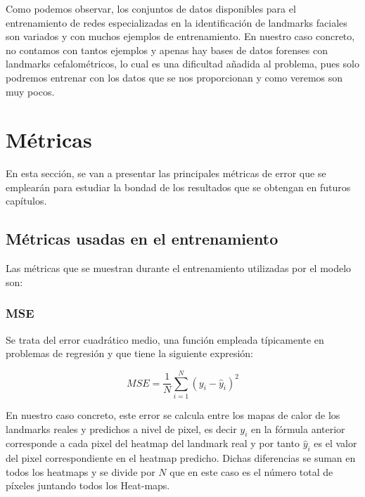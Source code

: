             \medskip

            \noindent Como podemos observar, los conjuntos de datos disponibles para el entrenamiento de redes especializadas en la identificación de landmarks faciales son variados y con muchos ejemplos de entrenamiento. En nuestro caso concreto, no contamos con tantos ejemplos y apenas hay bases de datos forenses con landmarks cefalométricos, lo cual es una dificultad añadida al problema, pues solo podremos entrenar con los datos que se nos proporcionan y como veremos son muy pocos.

\section{Métricas}

\noindent En esta sección, se van a presentar las principales métricas de error que se emplearán para estudiar la bondad de los resultados que se obtengan en futuros capítulos.

    \subsection{Métricas usadas en el entrenamiento}
        \noindent Las métricas que se muestran durante el entrenamiento utilizadas por el modelo son:

        \subsubsection{MSE}
            \noindent Se trata del error cuadrático medio, una función empleada típicamente en problemas de regresión y que tiene la siguiente expresión: 

            \begin{equation}
                MSE = \frac{1}{N} \sum_{i=1}^{N} (y_i - \widehat{y}_i)^2
            \end{equation}

            \noindent En nuestro caso concreto, este error se calcula entre los mapas de calor de los landmarks reales y predichos a nivel de pixel, es decir $y_i$ en la fórmula anterior corresponde a cada pixel del heatmap del landmark real y por tanto $\widehat{y}_i$ es el valor del pixel correspondiente en el heatmap predicho. Dichas diferencias se suman en todos los heatmaps y se divide por $N$ que en este caso es el número total de píxeles juntando todos los Heat-maps.

            \medskip

